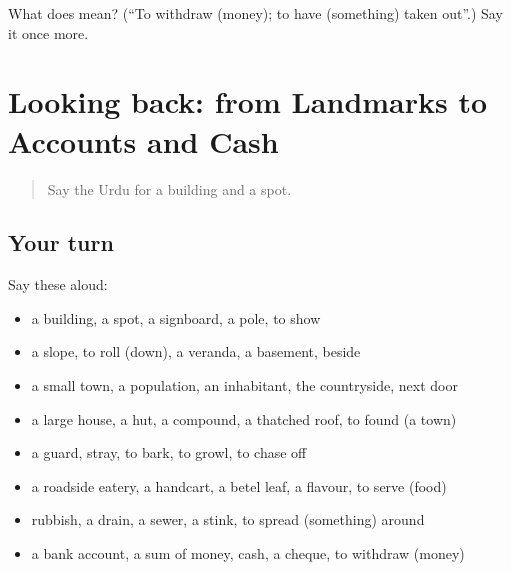 \begin{tcolorbox}[breakable,colback=teal!4,colframe=teal!35!black,title={Before you move on}]
What does  mean? (\textquotedblleft{}To withdraw (money); to have (something) taken out\textquotedblright{}.) Say it once more.
\end{tcolorbox}
\section[(dialogue)]{Looking back: from Landmarks to Accounts and Cash}

\label{lesson:UR-R417-review-410-417}



\begin{quote}
Say the Urdu for a building and a spot.
\end{quote}

\subsection*{Your turn}
Say these aloud:

\begin{itemize}
\raggedright
  \item a building, a spot, a signboard, a pole, to show
  \item a slope, to roll (down), a veranda, a basement, beside
  \item a small town, a population, an inhabitant, the countryside, next door
  \item a large house, a hut, a compound, a thatched roof, to found (a town)
  \item a guard, stray, to bark, to growl, to chase off
  \item a roadside eatery, a handcart, a betel leaf, a flavour, to serve (food)
  \item rubbish, a drain, a sewer, a stink, to spread (something) around
  \item a bank account, a sum of money, cash, a cheque, to withdraw (money)
\end{itemize}

